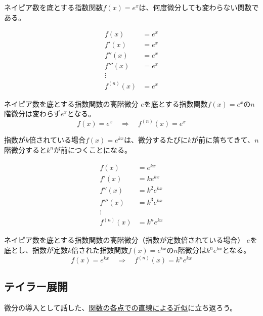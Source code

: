 \documentclass[../math-imaging]{subfiles}
\begin{document}
ネイピア数を底とする指数関数$f(x)=e^x$は、何度微分しても変わらない関数である。

\begin{align}
  f(x)       & = e^x \\
  f'(x)      & = e^x \\
  f''(x)     & = e^x \\
  f'''(x)    & = e^x \\
  \vdots     &       \\
  f^{(n)}(x) & = e^x
\end{align}

\begin{theorem}{ネイピア数を底とする指数関数の高階微分}
  \newline
  $e$を底とする指数関数$f(x) = e^x$の$n$階微分は変わらず$e^x$となる。
  \LARGE
  \begin{equation}
    f(x) = e^{x} \quad \Longrightarrow \quad f^{(n)}(x) = e^{x}
  \end{equation}
\end{theorem}

指数が$k$倍されている場合$f(x)=e^{kx}$は、微分するたびに$k$が前に落ちてきて、$n$階微分すると$k^n$が前につくことになる。

\begin{align}
  f(x)       & = e^{kx}     \\
  f'(x)      & = ke^{kx}    \\
  f''(x)     & = k^2 e^{kx} \\
  f'''(x)    & = k^3 e^{kx} \\
  \vdots     &              \\
  f^{(n)}(x) & = k^ne^{kx}
\end{align}

\begin{theorem}{ネイピア数を底とする指数関数の高階微分（指数が定数倍されている場合）}
  \newline
  $e$を底とし、指数が定数$k$倍された指数関数$f(x) = e^{kx}$の$n$階微分は$k^n e^{kx}$となる。
  \LARGE
  \begin{equation}
    f(x) = e^{kx} \quad \Longrightarrow \quad f^{(n)}(x) = k^n e^{kx}
  \end{equation}
\end{theorem}

\subsection{テイラー展開}

微分の導入として話した、\hyperref[theorem:関数の各点での直線による近似]{関数の各点での直線による近似}に立ち返ろう。
\end{document}
